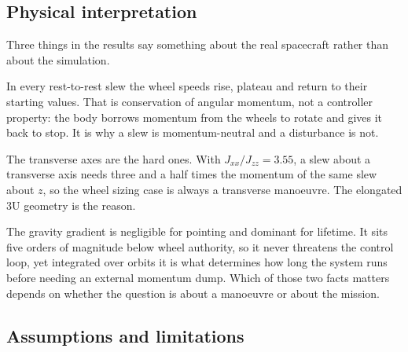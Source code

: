 \documentclass[conference,10pt,a4paper]{IEEEtran}
\begin{document}
\subsection{Physical interpretation}

Three things in the results say something about the real spacecraft rather than
about the simulation.

In every rest-to-rest slew the wheel speeds rise, plateau and return to their
starting values. That is conservation of angular momentum, not a controller
property: the body borrows momentum from the wheels to rotate and gives it back
to stop. It is why a slew is momentum-neutral and a disturbance is not.

The transverse axes are the hard ones. With $J_{xx}/J_{zz}=3.55$, a slew about
a transverse axis needs three and a half times the momentum of the same slew
about $z$, so the wheel sizing case is always a transverse manoeuvre. The
elongated 3U geometry is the reason.

The gravity gradient is negligible for pointing and dominant for lifetime. It
sits five orders of magnitude below wheel authority, so it never threatens the
control loop, yet integrated over orbits it is what determines how long the
system runs before needing an external momentum dump. Which of those two facts
matters depends on whether the question is about a manoeuvre or about the
mission.

\subsection{Assumptions and limitations}
\label{sec:limitations}
\end{document}
